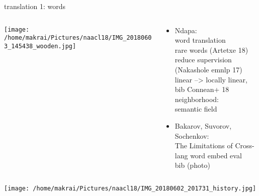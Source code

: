 \documentclass{beamer}
\begin{document}
\begin{frame}{translation 1: words}
  \begin{columns}
    \begin{column}{.35\textwidth}
      \centering 
      \texttt{[image: /home/makrai/Pictures/naacl18/IMG\_20180603\_145438\_wooden.jpg]}
    \end{column}
    \begin{column}{.65\textwidth}
      \begin{itemize} 
        \item Ndapa: \\  word translation
          \\ rare words (Artetxe 18)
          \\ reduce supervision (Nakashole emnlp 17)
          \\ linear --> locally linear,
          \\ bib Connean+ 18
          \\ neighborhood: \\  semantic field
        \item Bakarov, Suvorov, Sochenkov: \\  The Limitations of Cross-lang word embed eval 
          \\ bib (photo)
      \end{itemize}
    \end{column}
  \end{columns}
\end{frame}

\begin{frame}
  \texttt{[image: /home/makrai/Pictures/naacl18/IMG\_20180602\_201731\_history.jpg]}
\end{frame}
\end{document}
